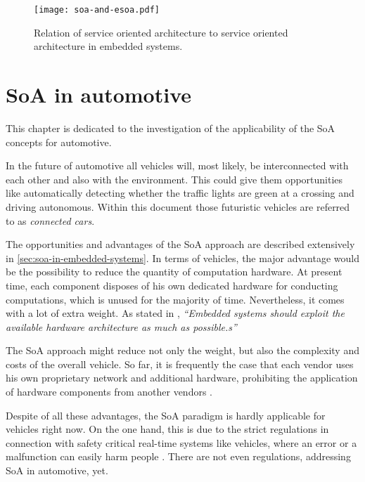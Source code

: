 \begin{figure}[!htbp]
\centering
\texttt{[image: soa-and-esoa.pdf]}
\caption{Relation of service oriented architecture to service oriented architecture in embedded systems.}
\label{fig:soa-and-esoa}
\end{figure}







\section{SoA in automotive}
\label{sec:soa-in-automotive}

This chapter is dedicated to the investigation of the applicability of the SoA concepts for automotive.

In the future of automotive all vehicles will, most likely, be interconnected with each other and also with the environment. This could give them opportunities like automatically detecting whether the traffic lights are green at a crossing and driving autonomous. Within this document those futuristic vehicles are referred to as \emph{connected cars}.


The opportunities and advantages of the SoA approach are described extensively in \ref{sec:soa-in-embedded-systems}. In terms of vehicles, the major advantage would be the possibility to reduce the quantity of computation hardware. At present time, each component disposes of his own dedicated hardware for conducting computations, which is unused for the majority of time. Nevertheless, it comes with a lot of extra weight. As stated in \cite[p.7]{marwedel}, \emph{``Embedded systems should exploit the available hardware architecture as much as possible.s''}

The SoA approach might reduce not only the weight, but also the complexity and costs of the overall vehicle. So far, it is frequently the case that each vendor uses his own proprietary network and additional hardware, prohibiting the application of hardware components from another vendors \cite{sommer}.

Despite of all these advantages, the SoA paradigm is hardly applicable for vehicles right now. On the one hand, this is due to the strict regulations in connection with safety critical real-time systems like vehicles, where an error or a malfunction can easily harm people \cite{kum}. There are not even regulations, addressing SoA in automotive, yet.

